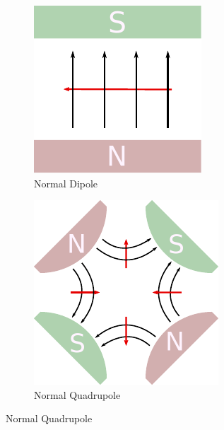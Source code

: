 \begin{figure}[!htb]
    \newlength{\magnetheight}
    \setlength{\magnetheight}{85px}
    \centering
    \begin{subfigure}{0.24\textwidth}
        \includegraphics[height=\magnetheight]{images/magnets/dipole_normal.pdf}
        \caption{
           Normal Dipole 
        }
        \label{fig:MBNorm}
    \end{subfigure}
    \begin{subfigure}{0.243\textwidth}
        \includegraphics[height=\magnetheight]{images/magnets/quadrupole_normal_f.pdf}
        \caption{
           Normal Quadrupole 
        }
        \label{fig:MQNorm}
    \end{subfigure}

\end{figure}

